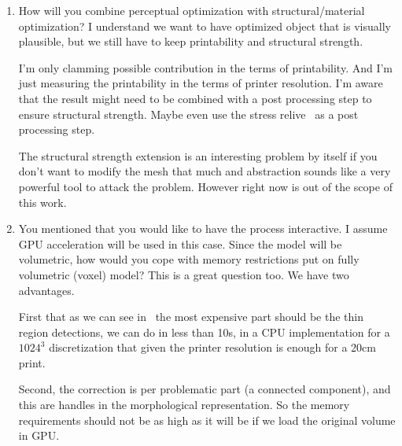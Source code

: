 \begin{enumerate}
	\item How will you combine perceptual optimization with structural/material optimization? I understand we want to have optimized object that is visually plausible, but we still have to keep printability and structural strength.
	
	I’m only clamming possible contribution in the terms of printability. And I'm just measuring the printability in the terms of printer resolution. I'm aware that the result might need to be combined with a post processing step to ensure structural strength. Maybe even use the stress relive~\cite{Stava2012} as a post processing step.
	
	The structural strength extension is an interesting problem by itself if you don't want to modify the mesh that much and abstraction sounds like a very powerful tool to attack the problem. However right now is out of the scope of this work.
	
	\item You mentioned that you would like to have the process interactive. I assume GPU acceleration will be used in this case. Since the model will be volumetric, how would you cope with memory restrictions put on fully volumetric (voxel) model?
	This is a great question too. We have two advantages. 
	
	First that as we can see in~\cite{Telea2011} the most expensive part should be the thin region detections, we can do in less than 10s, in a CPU implementation for a $1024^3$ discretization that given the printer resolution is enough for a 20cm print.
	
	Second, the correction is per problematic part (a connected component), and this are handles in the morphological representation. So the memory requirements should not be as high as it will be if we load the original volume in GPU.
		
\end{enumerate}